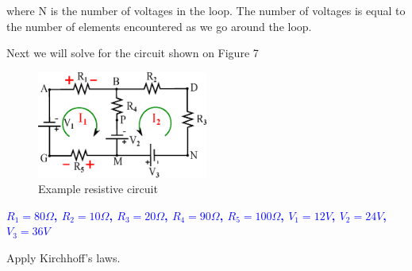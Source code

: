 \documentclass[a4 paper]{article}
\newcommand{\blue}[1]{\textcolor{blue}{#1}}
\numberwithin{equation}{section}
\newcommand{\0}{\mathbf{0}}
\begin{document}
where N is the number of voltages in the loop. The number of voltages is equal to the number of elements encountered as we go around the loop.

\vspace{60 mm}
Next we will solve for the circuit shown on Figure 7

\begin{figure}[ht!]
  \caption{Example resistive circuit}
  \centering
  \includegraphics[width=0.5\textwidth]{./images/circuit1/circuit5_1}
\end{figure}
\blue{\centerline{\bf $R_1 = 80\Omega$, $R_2 = 10\Omega$, $R_3 = 20\Omega$, $R_4 = 90\Omega$, $R_5 = 100\Omega$, $V_1 = 12V$, $V_2 = 24V$, $V_3 = 36V$}}

\vspace{8 mm}
Apply Kirchhoff’s laws.
\end{document}
